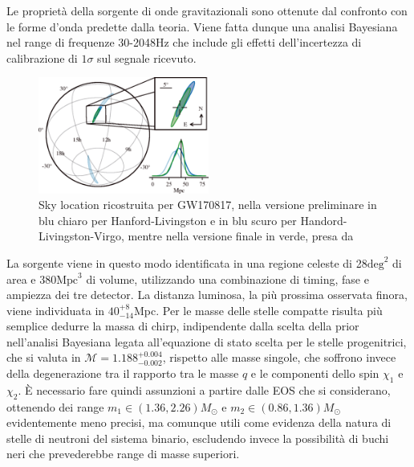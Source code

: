 Le proprietà della sorgente di onde gravitazionali sono ottenute dal confronto con le forme d'onda predette dalla teoria. Viene fatta dunque una analisi Bayesiana nel range di frequenze 30-2048Hz che include gli effetti dell'incertezza di calibrazione di $1\sigma$ sul segnale ricevuto.
\begin{figure}
	\vspace{-0pt}
	\begin{center}
		\includegraphics[width=0.5\textwidth]{figures/Capitolo_2/skymap.png}
	\end{center}
	\vspace{-5pt}
	\caption{Sky location ricostruita per GW170817, nella versione preliminare in blu chiaro per Hanford-Livingston e in blu scuro per Handord-Livingston-Virgo, mentre nella versione finale in verde, presa da \cite{Abbott_2019}}
	\label{fig:skymap}
	\vspace{-10pt}
\end{figure}
La sorgente viene in questo modo identificata in una regione celeste di 28$\text{deg}^2$ di area e $380\text{Mpc}^3$ di volume, utilizzando una combinazione di timing, fase e ampiezza dei tre detector. La distanza luminosa, la più prossima osservata finora, viene individuata in $40_{-14}^{+8}$Mpc. Per le masse delle stelle compatte risulta più semplice dedurre la massa di chirp, indipendente dalla scelta della prior nell'analisi Bayesiana legata all'equazione di stato scelta per le stelle progenitrici, che si valuta in $\mathcal{M}=1.188_{-0.002}^{+0.004}$, rispetto alle masse singole, che soffrono invece della degenerazione tra il rapporto tra le masse $q$ e le componenti dello spin $\chi_1$ e $\chi_2$. È necessario fare quindi assunzioni a partire dalle EOS che si considerano, ottenendo dei range $m_1 \in (1.36, 2.26)M_\odot$ e $m_2 \in (0.86, 1.36)M_\odot$ evidentemente meno precisi, ma comunque utili come evidenza della natura di stelle di neutroni del sistema binario, escludendo invece la possibilità di buchi neri che prevederebbe range di masse superiori\cite{Abbott_2017a}.

